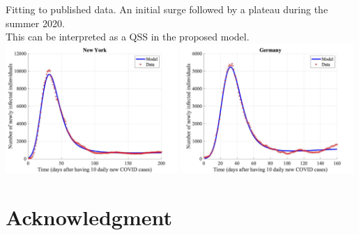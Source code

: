 \documentclass[10pt]{beamer}
\begin{document}
\begin{frame}{Fitting to published data.}
	An initial surge followed by a plateau during the summer 2020. \\ \vspace{0.5cm}
	This can be interpreted as a QSS in the proposed model. \\ \vspace{0.5cm}
	\includegraphics[width=0.49\textwidth]{epidemic-NewYork.jpeg} 
	\includegraphics[width=0.49\textwidth]{epidemic-Germany.jpeg} 
\end{frame}
\section{Acknowledgment}
\end{document}
